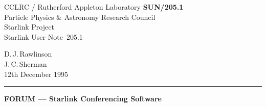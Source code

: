 \documentclass[twoside,11pt]{article}
\newcommand{\stardoccategory}  {Starlink User Note}
\newcommand{\stardocinitials}  {SUN}
\newcommand{\stardocnumber}    {205.1}
\newcommand{\stardocauthors}   {D.\,J.\,Rawlinson\\
                                J.\,C.\,Sherman}
\newcommand{\stardocdate}      {12th  December 1995}
\newcommand{\stardoctitle}     {FORUM --- Starlink Conferencing Software}
\newcommand{\stardocversion}   {[software version]}
\newcommand{\stardocmanual}    {[manual type]}
\newcommand{\stardocname}{\stardocinitials /\stardocnumber}
\newenvironment{latexonly}{}{}
\begin{document}
\thispagestyle{empty}

\begin{latexonly}
   CCLRC / {\sc Rutherford Appleton Laboratory} \hfill {\bf \stardocname}\\
   {\large Particle Physics \& Astronomy Research Council}\\
   {\large Starlink Project\\}
   {\large \stardoccategory\ \stardocnumber}
   \begin{flushright}
   \stardocauthors\\
   \stardocdate
   \end{flushright}
   \vspace{-4mm}
   \rule{\textwidth}{0.5mm}
   \vspace{5mm}
   \begin{center}
   {\Large \bf  \stardoctitle \\ [2.5ex]}
   \end{center}
   \vspace{5mm}

\end{latexonly}
\end{document}
